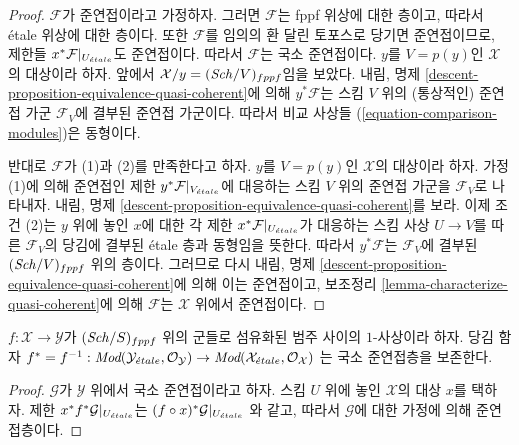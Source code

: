 \begin{proof}
$\mathcal{F}$가 준연접이라고 가정하자. 그러면 $\mathcal{F}$는
fppf 위상에 대한 층이고, 따라서 \'etale 위상에 대한 층이다.
또한 $\mathcal{F}$를 임의의 환 달린 토포스로 당기면 준연접이므로,
제한들 $x^*\mathcal{F}|_{U_{\acute{e}tale}}$도 준연접이다.
따라서 $\mathcal{F}$는 국소 준연접이다.
$y$를 $V = p(y)$인 $\mathcal{X}$의 대상이라 하자.
앞에서 $\mathcal{X}/y = (\mathit{Sch}/V)_{fppf}$임을 보았다.
내림, 명제 \ref{descent-proposition-equivalence-quasi-coherent}에 의해
$y^*\mathcal{F}$는 스킴 $V$ 위의 (통상적인) 준연접 가군
$\mathcal{F}_V$에 결부된 준연접 가군이다.
따라서 비교 사상들 (\ref{equation-comparison-modules})은 동형이다.

\medskip\noindent
반대로 $\mathcal{F}$가 (1)과 (2)를 만족한다고 하자.
$y$를 $V = p(y)$인 $\mathcal{X}$의 대상이라 하자.
가정 (1)에 의해 준연접인 제한 $y^*\mathcal{F}|_{V_{\acute{e}tale}}$에
대응하는 스킴 $V$ 위의 준연접 가군을 $\mathcal{F}_V$로 나타내자.
내림, 명제 \ref{descent-proposition-equivalence-quasi-coherent}를 보라.
이제 조건 (2)는 $y$ 위에 놓인 $x$에 대한 각 제한
$x^*\mathcal{F}|_{U_{\acute{e}tale}}$가 대응하는 스킴 사상 $U \to V$를
따른 $\mathcal{F}_V$의 당김에 결부된 \'etale 층과 동형임을 뜻한다.
따라서 $y^*\mathcal{F}$는 $\mathcal{F}_V$에 결부된
$(\mathit{Sch}/V)_{fppf}$ 위의 층이다. 그러므로 다시 내림, 명제
\ref{descent-proposition-equivalence-quasi-coherent}에 의해 이는
준연접이고, 보조정리 \ref{lemma-characterize-quasi-coherent}에 의해
$\mathcal{F}$는 $\mathcal{X}$ 위에서 준연접이다.
\end{proof}

\begin{lemma}
\label{lemma-pullback-lqc}
$f : \mathcal{X} \to \mathcal{Y}$가 $(\mathit{Sch}/S)_{fppf}$ 위의 군들로
섬유화된 범주 사이의 $1$-사상이라 하자. 당김 함자
$f^* = f^{-1} :
\textit{Mod}(\mathcal{Y}_{\acute{e}tale}, \mathcal{O}_\mathcal{Y})
\to
\textit{Mod}(\mathcal{X}_{\acute{e}tale}, \mathcal{O}_\mathcal{X})$
는 국소 준연접층을 보존한다.
\end{lemma}

\begin{proof}
$\mathcal{G}$가 $\mathcal{Y}$ 위에서 국소 준연접이라고 하자.
스킴 $U$ 위에 놓인 $\mathcal{X}$의 대상 $x$를 택하자.
제한 $x^*f^*\mathcal{G}|_{U_{\acute{e}tale}}$는
$(f \circ x)^*\mathcal{G}|_{U_{\acute{e}tale}}$
와 같고, 따라서 $\mathcal{G}$에 대한 가정에 의해 준연접층이다.
\end{proof}

